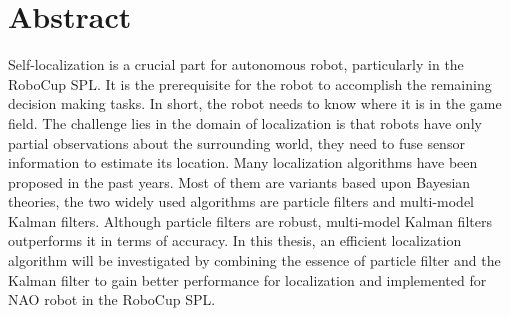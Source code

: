 \thispagestyle{empty}
\chapter*{Abstract}

%


Self-localization is a crucial part for autonomous robot, particularly in the RoboCup \gls{SPL}. It is the prerequisite for the robot to accomplish the remaining decision making tasks. In short, the robot needs to know where it is in the game field. The challenge lies in the domain of localization is that robots have only partial observations about the surrounding world, they need to fuse sensor information to estimate its location. Many localization algorithms have been proposed in the past years. Most of them are variants based upon Bayesian theories, the two widely used algorithms are particle filters and multi-model Kalman filters. Although particle filters are robust, multi-model Kalman filters outperforms it in terms of accuracy. In this thesis, an efficient localization algorithm will be investigated by combining the essence of particle filter and the Kalman filter to gain better performance for localization and implemented for NAO robot in the RoboCup \gls{SPL}.
